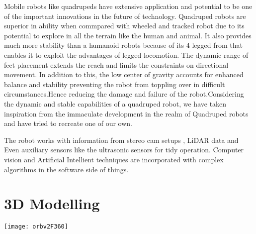 \documentclass[12pt,a4paper]{report}
\begin{document}
Mobile robots like quadrupeds have extensive application and potential to be one of the important innovations in the future of technology. Quadruped robots are superior in ability when commpared with wheeled and tracked robot due to its potential to explore in all the terrain like the human and animal. It also provides much more stability than a humanoid robots because of its 4 legged from that enables it to exploit the advantages of legged locomotion. The dynamic range of feet placement extends the reach and limits the constraints on directional movement. In addition to this, the low center of gravity accounts for enhanced balance and stability preventing the robot from toppling over in difficult circumstances.Hence reducing the damage and failure of the robot.Considering the dynamic and stable capabilities of a quadruped robot, we have taken inspiration from the immaculate development in the realm of Quadruped robots and have tried to recreate one of our own.

The robot works with information from stereo cam setups , LiDAR data and Even auxiliary sensors like the ultrasonic sensors  for tidy operation. Computer vision and Artificial Intellient techniques are incorporated with complex algorithms in the software side of things. 

\section{3D Modelling}

\texttt{[image: orbv2F360]}
\end{document}
